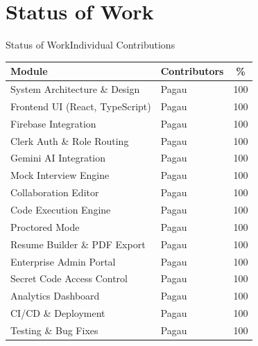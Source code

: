 \documentclass{beamer}
\begin{document}
\section{Status of Work}
\begin{frame}{Status of Work}{Individual Contributions}
\tiny
\begin{table}
\centering
\begin{tabular}{|p{3.8cm}|p{2.8cm}|c|}
\hline
\textbf{Module} & \textbf{Contributors} & \textbf{\%} \\ \hline
System Architecture \& Design & Pagau & 100 \\ \hline
Frontend UI (React, TypeScript) & Pagau & 100 \\ \hline
Firebase Integration & Pagau & 100 \\ \hline
Clerk Auth \& Role Routing & Pagau & 100 \\ \hline
Gemini AI Integration & Pagau & 100 \\ \hline
Mock Interview Engine & Pagau & 100 \\ \hline
Collaboration Editor & Pagau & 100 \\ \hline
Code Execution Engine & Pagau & 100 \\ \hline
Proctored Mode & Pagau & 100 \\ \hline
Resume Builder \& PDF Export & Pagau & 100 \\ \hline
Enterprise Admin Portal & Pagau & 100 \\ \hline
Secret Code Access Control & Pagau & 100 \\ \hline
Analytics Dashboard & Pagau & 100 \\ \hline
CI/CD \& Deployment & Pagau & 100 \\ \hline
Testing \& Bug Fixes & Pagau & 100 \\ \hline
\end{tabular}
\end{table}
\end{frame}

\end{document}
